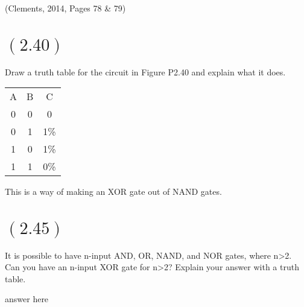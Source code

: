 \documentclass[letterpaper,12pt,titlepage]{article}
\begin{document}
(Clements, 2014, Pages 78 \& 79)

\section*{$(2.40)$} Draw a truth table for the circuit in Figure P2.40 and explain what it does.
  
\begin{tabular}{c c c}
A & B & C \\
0 & 0 & 0 \\
0 & 1 & 1\% \\
1 & 0 & 1\% \\
1 & 1 & 0\% \\
\end{tabular}

This is a way of making an XOR gate out of NAND gates.


\section*{$(2.45)$} It is possible to have n-input AND, OR, NAND, and NOR gates, where n\textgreater 2. Can you have an n-input XOR gate for n\textgreater 2? Explain your answer with a truth table.
  
answer here




\end{document}
